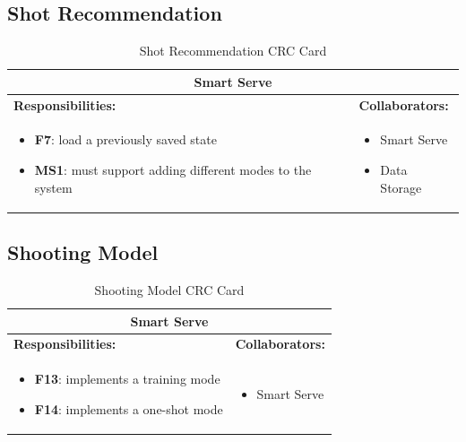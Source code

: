 \documentclass[11pt]{article}
\begin{document}
\subsection{Shot Recommendation}

\begin{table}[H]
\centering
\label{my-label}
\begin{tabular}{ | p{} | p{} | }
\hline
\multicolumn{2}{|c|}{\textbf{Smart Serve}}             \\ \hline
\textbf{Responsibilities:} & \textbf{Collaborators:} \\ \hline
\begin{itemize} 
\item \textbf{F7}: load a previously saved state
\item \textbf{MS1}: must support adding different modes to the system
\end{itemize} 
& 
\begin{itemize} 
\item Smart Serve
\item Data Storage
\end{itemize} \\ \hline
\end{tabular}
\caption{Shot Recommendation CRC Card}
\end{table}

\subsection{Shooting Model}

\begin{table}[H]
\centering
\label{my-label}
\begin{tabular}{ | p{} | p{} | }
\hline
\multicolumn{2}{|c|}{\textbf{Smart Serve}}             \\ \hline
\textbf{Responsibilities:} & \textbf{Collaborators:} \\ \hline
\begin{itemize} 
\item \textbf{F13}: implements a training mode
\item \textbf{F14}: implements a one-shot mode
\end{itemize} 
& 
\begin{itemize} 
\item Smart Serve
\end{itemize} \\ \hline
\end{tabular}
\caption{Shooting Model CRC Card}
\end{table}
\end{document}

